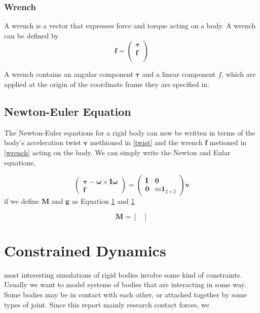     \subsubsection{Wrench}
        A wrench is a vector that expresses force and torque acting on a body. A wrench can be defined by
        \begin{equation}
            \mathbf{f} = \left( \begin{array}{c} \pmb{\tau} \\ \pmb{f} \\ \end{array} \right ) 
        \end{equation}

        A wrench contains an angular component $\pmb{\tau}$ and a linear component $f$, which are applied at the origin of the coordinate frame they are specified in.


\subsection{Newton-Euler Equation}
    The Newton-Euler equations for a rigid body can now be written in terms of the body's acceleration twist $\mathbf{v}$ methioned in \ref{twist} and the wrench $\mathbf{f}$ metioned in \ref{wrench} acting on the body. We can simply write the Newton and Eular equations,

    \begin{equation}
        \left( \begin{array}{c} \pmb{\tau} - \pmb{\omega} \times \pmb{I} \pmb{\omega}\\ \pmb{f} \end{array}\right) = \left( \begin{array}{cc} \pmb{I} & \pmb{0} \\ \pmb{0}& m\pmb{1}_{2\times 2}\end{array} \right ) \dot{\mathbf{v}}
    \end{equation}
    if we define $\pmb{M}$ and $\pmb{g}$ as Equation \ref{} and \ref{}

    \begin{equation}
        \pmb{M} = \begin{bmatrix}\end{bmatrix}
    \end{equation}


\section{Constrained Dynamics}
    most interesting simulations of rigid bodies involve some kind of constraints. Usually we want to model systems of bodies that are interacting in some way. Some bodies may be in contact with each other, or attached together by some types of joint. Since this report mainly research contact forces, we 
